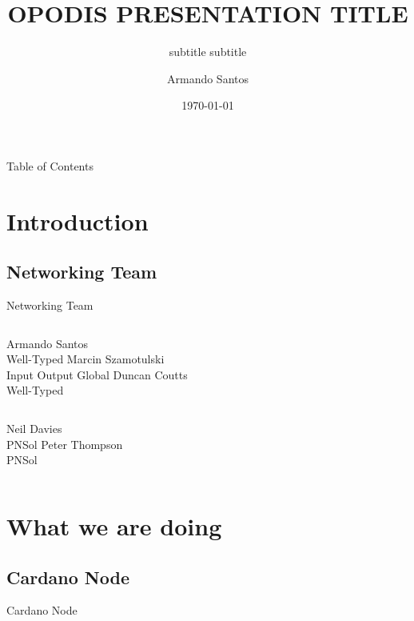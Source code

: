 \documentclass{beamer}
\begin{document}
\title{OPODIS PRESENTATION TITLE}
\subtitle{subtitle subtitle}
\author{Armando Santos}
\date{\today}
\maketitle


\begin{frame}{Table of Contents}
  \tableofcontents
\end{frame}

\section{Introduction}
\subsection*{Networking Team}
\begin{frame}{Networking Team}
  \begin{columns}
    \centering
    Armando Santos \\ Well-Typed
    \centering
    Marcin Szamotulski \\ Input Output Global
    \centering
    Duncan Coutts \\ Well-Typed
  \end{columns}
  \vskip1cm
  \begin{columns}
    \centering
    Neil Davies \\ PNSol
    \centering
    Peter Thompson \\ PNSol
  \end{columns}
\end{frame}

\section{What we are doing}

\subsection*{Cardano Node}
\begin{frame}{Cardano Node}
\end{frame}
\end{document}
